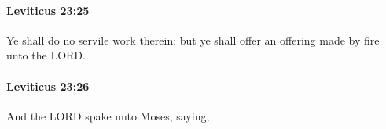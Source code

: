 		\paragraph{Leviticus 23:25} %
			\label{LEVITICUS-23-25}

			Ye shall do no servile work therein: but ye shall offer an offering made by fire unto the LORD.


		\paragraph{Leviticus 23:26} %
			\label{LEVITICUS-23-26}

			And the LORD spake unto Moses, saying,


